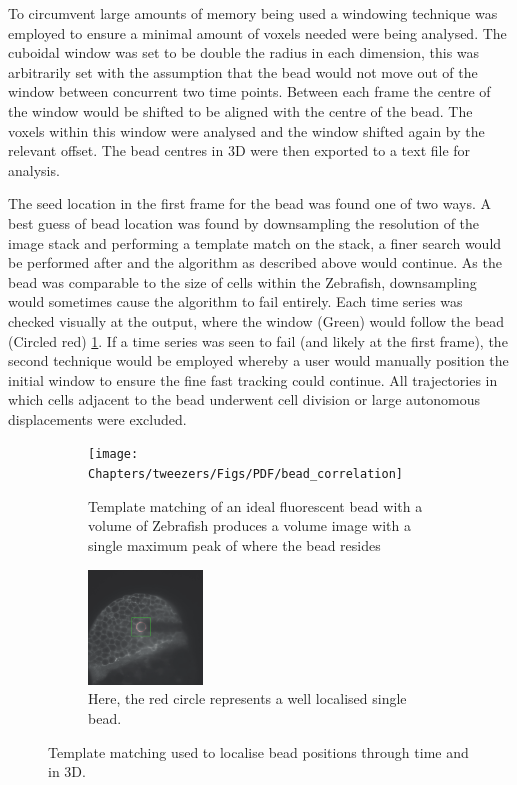 To circumvent large amounts of memory being used a windowing technique was employed to ensure a minimal amount of voxels needed were being analysed.
The cuboidal window was set to be double the radius in each dimension, this was arbitrarily set with the assumption that the bead would not move out of the window between concurrent two time points.
Between each frame the centre of the window would be shifted to be aligned with the centre of the bead.
The voxels within this window were analysed and the window shifted again by the relevant offset.
The bead centres in 3D were then exported to a text file for analysis.

The seed location in the first frame for the bead was found one of two ways.
A best guess of bead location was found by downsampling the resolution of the image stack and performing a template match on the stack, a finer search would be performed after and the algorithm as described above would continue.
As the bead was comparable to the size of cells within the Zebrafish, downsampling would sometimes cause the algorithm to fail entirely.
Each time series was checked visually at the output, where the window (Green) would follow the bead (Circled red) \ref{fig:bead_correlation}.
If a time series was seen to fail (and likely at the first frame), the second technique would be employed whereby a user would manually position the initial window to ensure the fine fast tracking could continue.
All trajectories in which cells adjacent to the bead underwent cell division or large autonomous displacements were excluded.

\begin{figure}[t!]
    \centering
    \begin{subfigure}[t]{0.4\textwidth}
        \centering
        \texttt{[image: Chapters/tweezers/Figs/PDF/bead\_correlation]}
        \caption{Template matching of an ideal fluorescent bead with a volume of Zebrafish produces a volume image with a single maximum peak of where the bead resides}
        \label{fig:bead_correlation}
    \end{subfigure}%
    \hspace{0.05\textwidth}
    \begin{subfigure}[t]{0.4\textwidth}
        \centering
        \includegraphics[height=1.2in]{Chapters/tweezers/Figs/PDF/bead_tracked}
        \caption{Here, the red circle represents a well localised single bead.}
        \label{fig:bead_tracked}
    \end{subfigure}
    \caption{Template matching used to localise bead positions through time and in 3D.  }
\end{figure}


